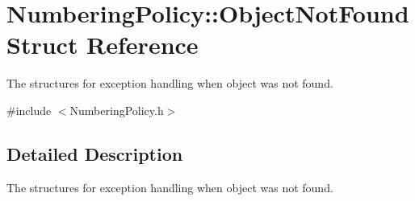 \section{NumberingPolicy::ObjectNotFound Struct Reference}
\label{structNumberingPolicy_1_1ObjectNotFound}


The structures for exception handling when object was not found.  




{\ttfamily \#include $<$NumberingPolicy.h$>$}



\subsection{Detailed Description}
The structures for exception handling when object was not found. 